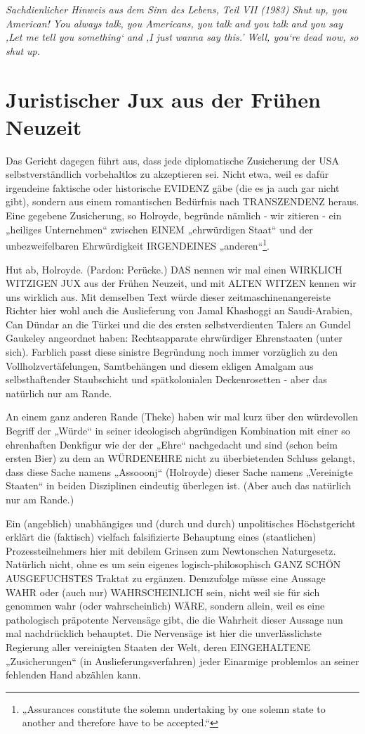 \begin{multicols}{2}
\textit{Sachdienlicher Hinweis aus dem Sinn des Lebens, Teil VII (1983)
Shut up, you American! You always talk, you Americans, you talk and you talk and you say 
‚Let me tell you something‘ and ‚I just wanna say this.’ Well, you‘re dead now, so shut up.}


\section{Juristischer Jux aus der Frühen Neuzeit}
Das Gericht dagegen führt aus, dass jede diplomatische
Zusicherung der USA selbstverständlich vorbehaltlos zu
akzeptieren sei. Nicht etwa, weil es dafür irgendeine faktische oder historische EVIDENZ gäbe (die es ja auch gar
nicht gibt), sondern aus einem romantischen Bedürfnis
nach TRANSZENDENZ heraus. Eine gegebene Zusicherung, so Holroyde, begründe nämlich - wir zitieren - ein
„heiliges Unternehmen“ zwischen EINEM „ehrwürdigen Staat“ und der unbezweifelbaren Ehrwürdigkeit 
IRGENDEINES „anderen“\footnote[32]{„Assurances constitute the solemn undertaking by one solemn state to another and therefore have to be accepted.“}.

Hut ab, Holroyde. (Pardon: Perücke.) DAS nennen wir
mal einen WIRKLICH WITZIGEN JUX aus der Frühen
Neuzeit, und mit ALTEN WITZEN kennen wir uns wirklich aus. Mit demselben Text würde dieser zeitmaschinenangereiste Richter hier wohl auch die Auslieferung
von Jamal Khashoggi an Saudi-Arabien, Can Dündar an
die Türkei und die des ersten selbstverdienten Talers an
Gundel Gaukeley angeordnet haben: Rechtsapparate
ehrwürdiger Ehrenstaaten (unter sich). Farblich passt
diese sinistre Begründung noch immer vorzüglich zu
den Vollholzvertäfelungen, Samtbehängen und diesem
ekligen Amalgam aus selbsthaftender Staubschicht und
spätkolonialen Deckenrosetten - aber das natürlich nur
am Rande.

An einem ganz anderen Rande (Theke) haben wir mal
kurz über den würdevollen Begriff der „Würde“ in seiner ideologisch abgründigen Kombination mit einer so
ehrenhaften Denkfigur wie der der „Ehre“ nachgedacht
und sind (schon beim ersten Bier) zu dem an WÜRDENEHRE nicht zu überbietenden Schluss gelangt, dass diese Sache namens „Assooonj“ (Holroyde) dieser Sache
namens „Vereinigte Staaten“ in beiden Disziplinen eindeutig überlegen ist. (Aber auch das natürlich nur am
Rande.)

Ein (angeblich) unabhängiges und (durch und durch)
unpolitisches Höchstgericht erklärt die (faktisch) vielfach falsifizierte Behauptung eines (staatlichen) Prozessteilnehmers hier mit debilem Grinsen zum Newtonschen Naturgesetz. Natürlich nicht, ohne es um sein
eigenes logisch-philosophisch GANZ SCHÖN AUSGEFUCHSTES Traktat zu ergänzen. Demzufolge müsse
eine Aussage WAHR oder (auch nur) WAHRSCHEINLICH sein, nicht weil sie für sich genommen wahr (oder
wahrscheinlich) WÄRE, sondern allein, weil es eine pathologisch präpotente Nervensäge gibt, die die Wahrheit
dieser Aussage nun mal nachdrücklich behauptet. Die
Nervensäge ist hier die unverlässlichste Regierung aller vereinigten Staaten der Welt, deren EINGEHALTENE
„Zusicherungen“ (in Auslieferungsverfahren) jeder Einarmige problemlos an seiner fehlenden Hand abzählen
kann.


\end{multicols}
